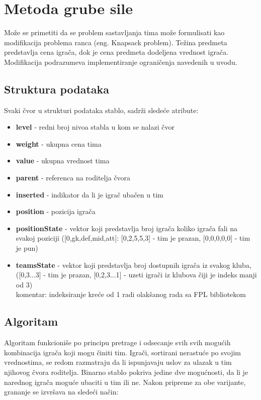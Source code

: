 \documentclass[a4paper]{article}
\begin{document}
\section{Metoda grube sile}

\vspace{3mm} 
Može se primetiti da se problem sastavljanja tima može formulisati kao modifikacija problema ranca (eng. Knapsack problem). Težina predmeta predstavlja cena igrača, dok je cena predmeta dodeljena vrednost igrača. Modifikacija podrazumeva implementiranje ograničenja navedenih u uvodu.

\subsection{Struktura podataka}
\vspace{3mm} 
Svaki čvor u strukturi podataka stablo, sadrži sledeće atribute: \\
\begin{itemize}
	\item \textbf{level} - redni broj nivoa stabla u kom se nalazi čvor
	\item \textbf{weight} - ukupna cena tima
	\item \textbf{value} - ukupna vrednost tima
	\item \textbf{parent} - referenca na roditelja čvora
	\item \textbf{inserted} - indikator da li je igrač ubačen u tim
	\item \textbf{position} - pozicija igrača
	\item \textbf{positionState} - vektor koji predstavlja broj igrača koliko igrača fali na svakoj poziciji ([0,gk,def,mid,att]: [0,2,5,5,3] - tim je prazan, [0,0,0,0,0] - tim je pun)
	\item \textbf{teamsState} -  vektor koji predstavlja broj dostupnih igrača iz svakog kluba, ([0,3...3] - tim je prazan, [0,2,3...1] - uzeti igrači iz klubova čiji je indeks manji od 3) \\
	
	komentar: indeksiranje kreće od 1 radi olakšanog rada sa FPL bibliotekom

\end{itemize}

\subsection{Algoritam}
\vspace{3mm} 

Algoritam funkcioniše po principu pretrage i odsecanje svih svih mogućih kombinacija igrača koji mogu činiti tim. Igrači, sortirani nerastuće po svojim vrednostima, se redom razmatraju da li ispunjavaju uslov za ulazak u tim njihovog čvora roditelja. Binarno stablo pokriva jedine dve mogućnosti, da li je narednog igrača moguće ubaciti u tim ili ne. Nakon pripreme za obe varijante, grananje se izvršava na sledeći način: 
\end{document}
